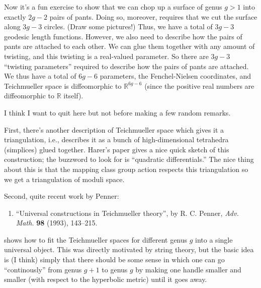 \documentclass{article}
\def\tightlist{}
\begin{document}
Now it's a fun exercise to show that we can chop up a surface of genus
\(g > 1\) into exactly \(2g-2\) pairs of pants. Doing so, moreover,
requires that we cut the surface along \(3g-3\) circles. (Draw some
pictures!) Thus, we have a total of \(3g-3\) geodesic length functions.
However, we also need to describe how the pairs of pants are attached to
each other. We can glue them together with any amount of twisting, and
this twisting is a real-valued parameter. So there are \(3g-3\)
``twisting parameters'' required to describe how the pairs of pants are
attached. We thus have a total of \(6g-6\) parameters, the
Fenchel-Nielsen coordinates, and Teichmueller space is diffeomorphic to
\(\mathbb{R}^{6g-6}\) (since the positive real numbers are diffeomorphic
to \(\mathbb{R}\) itself).

I think I want to quit here but not before making a few random remarks.

First, there's another description of Teichmueller space which gives it
a triangulation, i.e., describes it as a bunch of high-dimensional
tetrahedra (simplices) glued together. Harer's paper gives a nice quick
sketch of this construction; the buzzword to look for is ``quadratic
differentials.'' The nice thing about this is that the mapping class
group action respects this triangulation so we get a triangulation of
moduli space.

Second, quite recent work by Penner:

\begin{enumerate}
\def\labelenumi{\arabic{enumi})}
\setcounter{enumi}{6}
\tightlist
\item
  ``Universal constructions in Teichmueller theory'', by R. C. Penner,
  \emph{Adv. Math.} \textbf{98} (1993), 143--215.
\end{enumerate}

shows how to fit the Teichmueller spaces for different genus \(g\) into
a single universal object. This was directly motivated by string theory,
but the basic idea is (I think) simply that there should be some sense
in which one can go ``continously'' from genus \(g+1\) to genus \(g\) by
making one handle smaller and smaller (with respect to the hyperbolic
metric) until it goes away.
\end{document}
